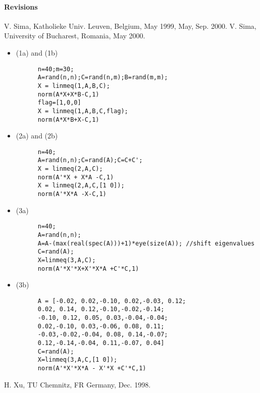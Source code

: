 \paragraph{Revisions}
V. Sima, Katholieke Univ. Leuven, Belgium, May 1999, May, Sep. 2000. V. Sima, University of Bucharest, Romania, May 2000.
\begin{examples}
\begin{itemize}
  \item (1a) and (1b)
    \begin{Verbatim}
      n=40;m=30;
      A=rand(n,n);C=rand(n,m);B=rand(m,m);
      X = linmeq(1,A,B,C);
      norm(A*X+X*B-C,1)
      flag=[1,0,0]
      X = linmeq(1,A,B,C,flag);
      norm(A*X*B+X-C,1)
    \end{Verbatim}
  \item (2a) and (2b)
    \begin{Verbatim}
      n=40;
      A=rand(n,n);C=rand(A);C=C+C';
      X = linmeq(2,A,C);
      norm(A'*X + X*A -C,1)
      X = linmeq(2,A,C,[1 0]);
      norm(A'*X*A -X-C,1)
    \end{Verbatim}
  \item (3a)
    \begin{Verbatim}
      n=40;
      A=rand(n,n);
      A=A-(max(real(spec(A)))+1)*eye(size(A)); //shift eigenvalues
      C=rand(A);
      X=linmeq(3,A,C);
      norm(A'*X'*X+X'*X*A +C'*C,1)
    \end{Verbatim}
  \item (3b)
    \begin{Verbatim}
      A = [-0.02, 0.02,-0.10, 0.02,-0.03, 0.12;
      0.02, 0.14, 0.12,-0.10,-0.02,-0.14;     
      -0.10, 0.12, 0.05, 0.03,-0.04,-0.04;     
      0.02,-0.10, 0.03,-0.06, 0.08, 0.11;      
      -0.03,-0.02,-0.04, 0.08, 0.14,-0.07;   
      0.12,-0.14,-0.04, 0.11,-0.07, 0.04]    
      C=rand(A);
      X=linmeq(3,A,C,[1 0]);
      norm(A'*X'*X*A - X'*X +C'*C,1)
    \end{Verbatim}
  \end{itemize}
\end{examples}
\begin{manseealso}
     
\end{manseealso}
\begin{authors}
  H. Xu, TU Chemnitz, FR Germany, Dec. 1998.  
\end{authors}
